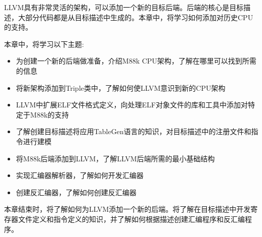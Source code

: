 LLVM具有非常灵活的架构，可以添加一个新的目标后端。后端的核心是目标描述，大部分代码都是从目标描述中生成的。本章中，将学习如何添加对历史CPU的支持。

本章中，将学习以下主题:

\begin{itemize}
\item
为创建一个新的后端做准备，介绍M88k CPU架构，了解在哪里可以找到所需的信息

\item
将新架构添加到Triple类中，了解如何使LLVM意识到新的CPU架构

\item
LLVM中扩展ELF文件格式定义，向处理ELF对象文件的库和工具中添加对特定于M88k的支持

\item
了解创建目标描述将应用TableGen语言的知识，对目标描述中的注册文件和指令进行建模

\item
将M88k后端添加到LLVM，了解LLVM后端所需的最小基础结构

\item
实现汇编器解析器，了解如何开发汇编器

\item
创建反汇编器，了解如何创建反汇编器
\end{itemize}

本章结束时，将了解如何为LLVM添加一个新的后端。将了解在目标描述中开发寄存器文件定义和指令定义的知识，并了解如何根据描述创建汇编程序和反汇编程序。























